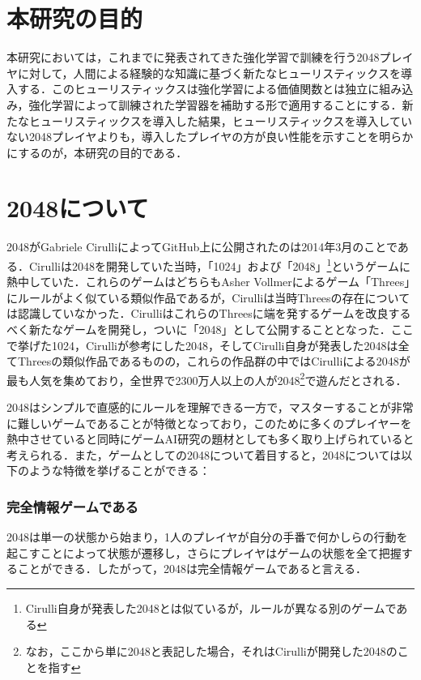 \documentclass{suribt}
\begin{document}
\section{本研究の目的}
本研究においては，これまでに発表されてきた強化学習で訓練を行う2048プレイヤに対して，人間による経験的な知識に基づく新たなヒューリスティックスを導入する．このヒューリスティックスは強化学習による価値関数とは独立に組み込み，強化学習によって訓練された学習器を補助する形で適用することにする．新たなヒューリスティックスを導入した結果，ヒューリスティックスを導入していない2048プレイヤよりも，導入したプレイヤの方が良い性能を示すことを明らかにするのが，本研究の目的である．

\section{2048について}
2048がGabriele CirulliによってGitHub上に公開されたのは2014年3月のことである\cite{BusinessInsider}．Cirulliは2048を開発していた当時，「1024」および「2048」\footnote{Cirulli自身が発表した2048とは似ているが，ルールが異なる別のゲームである}というゲームに熱中していた\cite{CirulliMedium}．これらのゲームはどちらもAsher Vollmerによるゲーム「Threes」にルールがよく似ている類似作品であるが，Cirulliは当時Threesの存在については認識していなかった．CirulliはこれらのThreesに端を発するゲームを改良するべく新たなゲームを開発し，ついに「2048」として公開することとなった．ここで挙げた1024，Cirulliが参考にした2048，そしてCirulli自身が発表した2048は全てThreesの類似作品であるものの，これらの作品群の中ではCirulliによる2048が最も人気を集めており，全世界で2300万人以上の人が2048\footnote{なお，ここから単に2048と表記した場合，それはCirulliが開発した2048のことを指す}で遊んだとされる\cite{CirulliMedium}．

2048はシンプルで直感的にルールを理解できる一方で，マスターすることが非常に難しいゲームであることが特徴となっており，このために多くのプレイヤーを熱中させていると同時にゲームAI研究の題材としても多く取り上げられていると考えられる．また，ゲームとしての2048について着目すると，2048については以下のような特徴を挙げることができる：

\subsubsection{完全情報ゲームである}
2048は単一の状態から始まり，1人のプレイヤが自分の手番で何かしらの行動を起こすことによって状態が遷移し，さらにプレイヤはゲームの状態を全て把握することができる．したがって，2048は完全情報ゲームであると言える．
\end{document}

